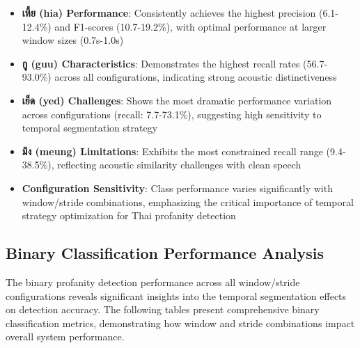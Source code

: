 \documentclass[11pt]{article}
\newcommand{\textthai}[1]{{\thaifont #1}}
\begin{document}
\begin{itemize}
    \item \textbf{\textthai{เหี้ย} (hia) Performance}: Consistently achieves the highest precision (6.1-12.4\%) and F1-scores (10.7-19.2\%), with optimal performance at larger window sizes (0.7s-1.0s)
    \item \textbf{\textthai{กู} (guu) Characteristics}: Demonstrates the highest recall rates (56.7-93.0\%) across all configurations, indicating strong acoustic distinctiveness
    \item \textbf{\textthai{เย็ด} (yed) Challenges}: Shows the most dramatic performance variation across configurations (recall: 7.7-73.1\%), suggesting high sensitivity to temporal segmentation strategy
    \item \textbf{\textthai{มึง} (meung) Limitations}: Exhibits the most constrained recall range (9.4-38.5\%), reflecting acoustic similarity challenges with clean speech
    \item \textbf{Configuration Sensitivity}: Class performance varies significantly with window/stride combinations, emphasizing the critical importance of temporal strategy optimization for Thai profanity detection
\end{itemize}

\subsection{Binary Classification Performance Analysis}
The binary profanity detection performance across all window/stride configurations reveals significant insights into the temporal segmentation effects on detection accuracy. The following tables present comprehensive binary classification metrics, demonstrating how window and stride combinations impact overall system performance.
\end{document}
